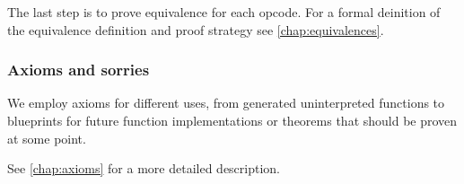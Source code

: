 The last step is to prove equivalence for each opcode. For a formal deinition of
the equivalence definition and proof strategy see \ref{chap:equivalences}.

\subsubsection*{Axioms and sorries}

We employ axioms for different uses, from generated uninterpreted functions to
blueprints for future function implementations or theorems that should be proven
at some point.

See \ref{chap:axioms} for a more detailed description.


